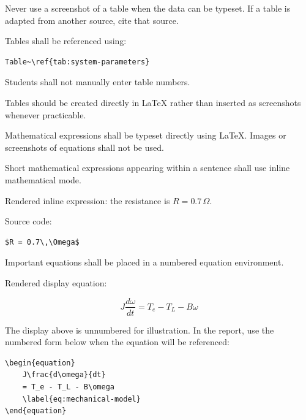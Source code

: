 {Never use a screenshot of a table when the data can be typeset. If a
table is adapted from another source, cite that source.

Tables shall be referenced using:

\begin{verbatim}
Table~\ref{tab:system-parameters}
\end{verbatim}

Students shall not manually enter table numbers.

Tables should be created directly in \LaTeX{} rather than inserted
as screenshots whenever practicable.

\vspace{0.3cm}



Mathematical expressions shall be typeset directly using \LaTeX{}.
Images or screenshots of equations shall not be used.

Short mathematical expressions appearing within a sentence shall
use inline mathematical mode.

\RegExample Rendered inline expression: the resistance is
$R = 0.7\,\Omega$.

Source code:

\begin{verbatim}
$R = 0.7\,\Omega$
\end{verbatim}

Important equations shall be placed in a numbered equation
environment.

\RegExample Rendered display equation:

\begin{equation*}
    J\frac{d\omega}{dt}=T_e-T_L-B\omega
\end{equation*}

The display above is unnumbered for illustration. In the report,
use the numbered form below when the equation will be referenced:

\begin{verbatim}
\begin{equation}
    J\frac{d\omega}{dt}
    = T_e - T_L - B\omega
    \label{eq:mechanical-model}
\end{equation}
\end{verbatim}

}
